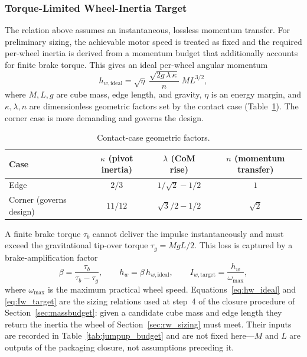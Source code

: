 \subsubsection{Torque-Limited Wheel-Inertia Target}
\label{sec:jumpup_target}

The relation above assumes an instantaneous, lossless momentum transfer. For
preliminary sizing, the achievable motor speed is treated as fixed and the
required per-wheel inertia is derived from a momentum budget that additionally
accounts for finite brake torque. This gives an ideal per-wheel angular
momentum
\begin{equation}
h_{w,\text{ideal}} = \sqrt{\eta}\;\frac{\sqrt{2 g\,\lambda\,\kappa}}{n}\;M L^{3/2},
\label{eq:hw_ideal}
\end{equation}
where $M, L, g$ are cube mass, edge length, and gravity, $\eta$ is an energy
margin, and $\kappa,\lambda,n$ are dimensionless geometric factors set by the
contact case (Table~\ref{tab:contact_factors}). The corner case is more
demanding and governs the design.

\begin{table}[htbp]
\centering
\caption[Contact-case geometric factors]{Contact-case geometric factors.}
\label{tab:contact_factors}
\begin{tabular}{lccc}
\toprule
Case & $\kappa$ (pivot inertia) & $\lambda$ (CoM rise) & $n$ (momentum transfer) \\
\midrule
Edge & $2/3$ & $1/\sqrt2 - 1/2$ & $1$ \\
Corner (governs design) & $11/12$ & $\sqrt3/2 - 1/2$ & $\sqrt2$ \\
\bottomrule
\end{tabular}
\end{table}

A finite brake torque $\tau_b$ cannot deliver the impulse instantaneously and
must exceed the gravitational tip-over torque $\tau_g = MgL/2$. This loss is
captured by a brake-amplification factor
\begin{equation}
\beta = \frac{\tau_b}{\tau_b - \tau_g},
\qquad
h_w = \beta\,h_{w,\text{ideal}},
\qquad
I_{w,\text{target}} = \frac{h_w}{\omega_{\max}},
\label{eq:Iw_target}
\end{equation}
where $\omega_{\max}$ is the maximum practical wheel speed.
Equations~\eqref{eq:hw_ideal} and \eqref{eq:Iw_target} are the sizing relations
used at step~4 of the closure procedure of Section~\ref{sec:massbudget}: given a
candidate cube mass and edge length they return the inertia the wheel of
Section~\ref{sec:rw_sizing} must meet. Their inputs are recorded in
Table~\ref{tab:jumpup_budget} and are not fixed here---$M$ and $L$ are outputs
of the packaging closure, not assumptions preceding it.

